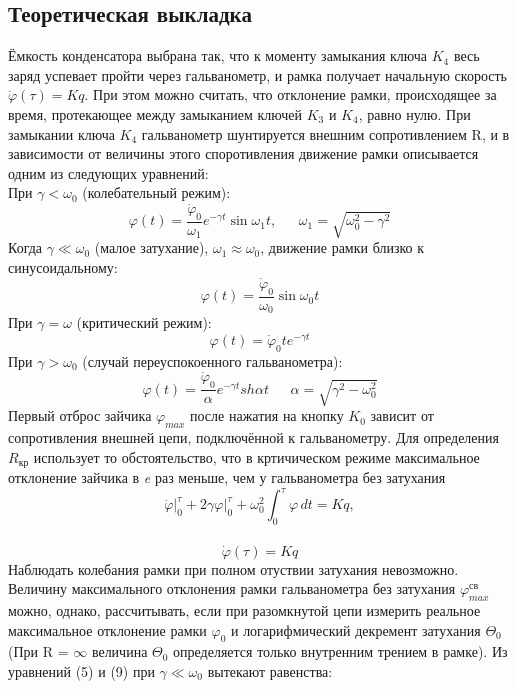 \documentclass[a4paper,12pt]{article} %
\begin{document}
\subsection{Теоретическая выкладка}
Ёмкость конденсатора выбрана так, что к моменту замыкания ключа $K_4$ весь заряд успевает пройти через гальванометр, и рамка получает начальную скорость $\dot\varphi(\tau) = Kq$. При этом можно считать, что отклонение рамки, происходящее за время, протекающее между замыканием ключей $K_3$ и $K_4$, равно нулю. При замыкании ключа $K_4$ гальванометр шунтируется внешним сопротивлением R, и в зависимости от величины этого споротивления движение рамки описывается одним из следующих уравнений:
\\
При $\gamma < \omega_0$ (колебательный режим):
\begin{equation}
\varphi(t) = \frac{\dot\varphi_0}{\omega_1}e^{-\gamma t}\sin{\omega_1t},
\  \  \  \  \  \  \
\omega_1 = \sqrt{\omega_0^2 - \gamma^2}
\end{equation}
Когда $\gamma \ll \omega_0$ (малое затухание), $\omega_1 \approx \omega_0$, движение рамки близко к синусоидальному:
\begin{equation}
\varphi(t) = \frac{\dot\varphi_0}{\omega_0}\sin{\omega_0t}
\end{equation}
При $\gamma = \omega$ (критический режим):
\begin{equation}
\varphi(t) = \dot\varphi_0te^{-\gamma t}
\end{equation}
При $\gamma > \omega_0$ (случай переуспокоенного гальванометра):
\begin{equation}
\varphi(t) = \frac{\dot\varphi_0}{\alpha}e^{-\gamma t}sh{\alpha t} 
\  \  \  \  \  \  \
\alpha = \sqrt{\gamma^2 - \omega_0^2}
\end{equation}
Первый отброс зайчика $\varphi_{max}$ после нажатия на кнопку $K_0$ зависит от сопротивления внешней цепи, подключённой к гальванометру. Для определения $R_\text{кр}$ использует то обстоятельство, что в кртичическом режиме максимальное отклонение зайчика в \textit{e} раз меньше, чем у гальванометра без затухания
\begin{equation}
\dot{\varphi}\big|_{0}^{\tau} + 2\gamma \varphi\big|_{0}^{\tau} + \omega_0^2 \int_{0}^{\tau} \varphi \, dt = Kq,
\end{equation}
\\
\begin{equation}
\dot\varphi(\tau) = Kq
\end{equation}
Наблюдать колебания рамки при полном отуствии затухания невозможно. Величину максимального отклонения рамки гальванометра без затухания $\varphi^{\text{св}}_{max}$ можно, однако, рассчитывать, если при разомкнутой цепи измерить реальное максимальное отклонение рамки $\varphi_0$ и логарифмический декремент затухания $\Theta_0$ (При R = $\infty$ величина $\Theta_0$ определяется только внутренним трением в рамке). Из уравнений (5) и (9) при $\gamma \ll \omega_0$ вытекают равенства:
\end{document}
